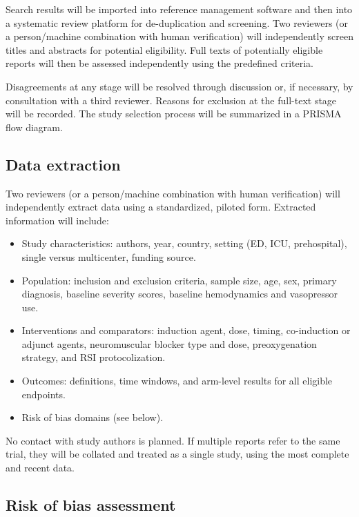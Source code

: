 \documentclass[11pt]{article}
\begin{document}
Search results will be imported into reference management software and then into a systematic review platform for de-duplication and screening. Two reviewers (or a person/machine combination with human verification) will independently screen titles and abstracts for potential eligibility. Full texts of potentially eligible reports will then be assessed independently using the predefined criteria.

Disagreements at any stage will be resolved through discussion or, if necessary, by consultation with a third reviewer. Reasons for exclusion at the full-text stage will be recorded. The study selection process will be summarized in a PRISMA flow diagram.

\subsection{Data extraction}

Two reviewers (or a person/machine combination with human verification) will independently extract data using a standardized, piloted form. Extracted information will include:

\begin{itemize}
  \item Study characteristics: authors, year, country, setting (ED, ICU, prehospital), single versus multicenter, funding source.
  \item Population: inclusion and exclusion criteria, sample size, age, sex, primary diagnosis, baseline severity scores, baseline hemodynamics and vasopressor use.
  \item Interventions and comparators: induction agent, dose, timing, co-induction or adjunct agents, neuromuscular blocker type and dose, preoxygenation strategy, and RSI protocolization.
  \item Outcomes: definitions, time windows, and arm-level results for all eligible endpoints.
  \item Risk of bias domains (see below).
\end{itemize}

No contact with study authors is planned. If multiple reports refer to the same trial, they will be collated and treated as a single study, using the most complete and recent data.

\subsection{Risk of bias assessment}
\end{document}
